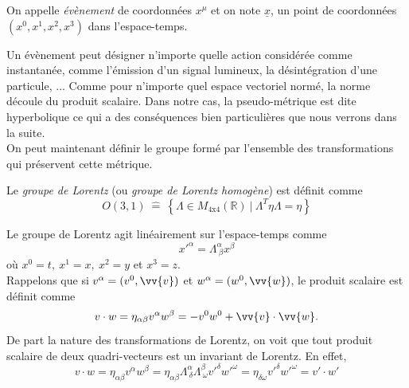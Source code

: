 \documentclass[a4paper,11pt]{report}
\begin{document}
            \begin{definition}
                On appelle \textit{évènement} de coordonnées $x^\mu$ et on note $\underline{x}$, un point de coordonnées $(x^0,x^1,x^2,x^3)$ dans l'espace-temps.
            \end{definition}
            
            Un évènement peut désigner n'importe quelle action considérée comme instantanée, comme l'émission d'un signal lumineux, la désintégration d'une particule, ... Comme pour n'importe quel espace vectoriel normé, la norme découle du produit scalaire. Dans notre cas, la pseudo-métrique est dite hyperbolique ce qui a des conséquences bien particulières que nous verrons dans la suite.\\
            
            On peut maintenant définir le groupe formé par l'ensemble des transformations qui préservent cette métrique.
            \begin{definition}
                Le \textit{groupe de Lorentz} (ou \textit{groupe de Lorentz homogène}) est définit comme
                $$O(3,1)~\hat{=}~\left\{\Lambda\in M_{4\text{x}4}(\mathbb{R})~\big|~\Lambda^T\eta\Lambda = \eta\right\}$$
            \end{definition}
            
            Le groupe de Lorentz agit linéairement sur l'espace-temps comme
            \begin{equation}
                x'^\alpha = \Lambda^\alpha_{~\beta}x^\beta
            \end{equation}
            où $x^0 = t, ~x^1 = x, ~x^2 = y$ et $x^3 = z$.\\
            Rappelons que si $v^\alpha = (v^0,\vv{v})$ et $w^\alpha = (w^0,\vv{w})$, le produit scalaire est définit comme
            \begin{equation}
                v\cdot w = \eta_{\alpha\beta}v^\alpha w^\beta = -v^0w^0+\vv{v}\cdot\vv{w}.
            \end{equation}
            De part la nature des transformations de Lorentz, on voit que tout produit scalaire de deux quadri-vecteurs est un invariant de Lorentz. En effet, 
            \begin{equation}
                v\cdot w = \eta_{\alpha\beta}v^\alpha w^\beta = \eta_{\alpha\beta} \Lambda^\alpha_{~\delta}  \Lambda^\beta_{~\omega} v'^\delta w'^\omega = \eta_{\delta\omega}  v'^\delta w'^\omega = v'\cdot w'
            \end{equation}
            
\end{document}

